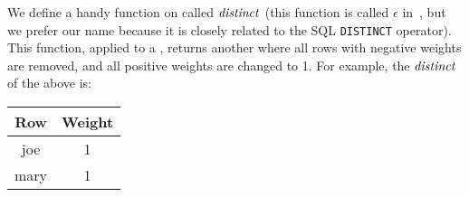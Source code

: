 
%
%


We define a handy function on \zrs called $\mathit{distinct}$ (this function
is called $\epsilon$ in~\cite{griffin-sigmod95}, but we prefer our
name because it is closely related to the SQL \texttt{DISTINCT}
operator).  This function, applied to a \zr, returns another \zr
where all rows with negative weights are removed, and all positive
weights are changed to 1.  For example, the $\mathit{distinct}$ of the above
\zr is:

\begin{center}
\begin{tabular}{|c|c|}\hline
  Row & Weight \\ \hline
  joe & 1 \\
  mary & 1 \\ \hline
\end{tabular}
\end{center}

